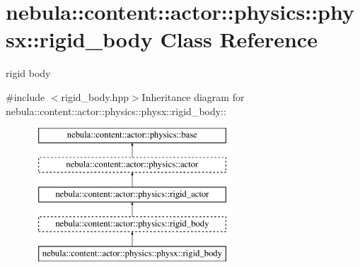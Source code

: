 \hypertarget{classnebula_1_1content_1_1actor_1_1physics_1_1physx_1_1rigid__body}{
\section{nebula::content::actor::physics::physx::rigid\_\-body Class Reference}
\label{classnebula_1_1content_1_1actor_1_1physics_1_1physx_1_1rigid__body}
}


rigid body  


{\ttfamily \#include $<$rigid\_\-body.hpp$>$}Inheritance diagram for nebula::content::actor::physics::physx::rigid\_\-body::\begin{figure}[H]
\begin{center}
\leavevmode
\includegraphics[height=5cm]{classnebula_1_1content_1_1actor_1_1physics_1_1physx_1_1rigid__body}
\end{center}
\end{figure}
